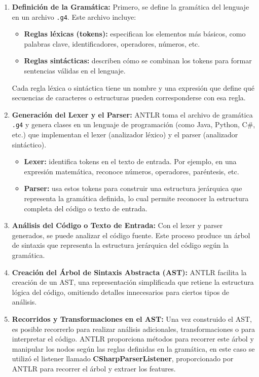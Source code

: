  \begin{enumerate}
    \item \textbf{Definición de la Gramática:}
    Primero, se define la gramática del lenguaje en un archivo \texttt{.g4}. Este archivo incluye:
    \begin{itemize}
        \item \textbf{Reglas léxicas (tokens):} especifican los elementos más básicos, como palabras clave, identificadores, operadores, números, etc.
        \item \textbf{Reglas sintácticas:} describen cómo se combinan los tokens para formar sentencias válidas en el lenguaje.
    \end{itemize}
    Cada regla léxica o sintáctica tiene un nombre y una expresión que define qué secuencias de caracteres o estructuras pueden corresponderse con esa regla.

    \item \textbf{Generación del Lexer y el Parser:}
    ANTLR toma el archivo de gramática \texttt{.g4} y genera clases en un lenguaje de programación (como Java, Python, C\#, etc.) que implementan el lexer (analizador léxico) y el parser (analizador sintáctico).
    \begin{itemize}
        \item \textbf{Lexer:} identifica tokens en el texto de entrada. Por ejemplo, en una expresión matemática, reconoce números, operadores, paréntesis, etc.
        \item \textbf{Parser:} usa estos tokens para construir una estructura jerárquica que representa la gramática definida, lo cual permite reconocer la estructura completa del código o texto de entrada.
    \end{itemize}

    \item \textbf{Análisis del Código o Texto de Entrada:} Con el lexer y parser generados, se puede analizar el código fuente. Este proceso produce un árbol de sintaxis que representa la estructura jerárquica del código según la gramática.

    \item \textbf{Creación del Árbol de Sintaxis Abstracta (AST):} ANTLR facilita la creación de un AST, una representación simplificada que retiene la estructura lógica del código, omitiendo detalles innecesarios para ciertos tipos de análisis.

    \item \textbf{Recorridos y Transformaciones en el AST:} Una vez construido el AST, es posible recorrerlo para realizar análisis adicionales, transformaciones o para interpretar el código. ANTLR proporciona métodos para recorrer este árbol y manipular los nodos según las reglas definidas en la gramática, en este caso se utilizó el listener llamado {\bf CSharpParserListener}, proporcionado por ANTLR para recorrer el árbol y extraer los features.
\end{enumerate}



